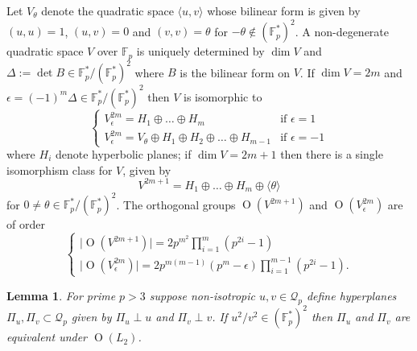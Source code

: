 \documentclass[11pt]{article}
\newtheorem{lem}[thm]{Lemma}
\newcommand{\FF}{\mathbb{F}}
\newcommand{\qc}{\mathcal{Q}}
\newcommand{\la}{\langle}
\newcommand{\ra}{\rangle}
\newcommand{\opn}{\operatorname}
\newcommand{\op}{\oplus}
\newcommand{\beq}{\begin{equation*}}
\newcommand{\eeq}{\end{equation*}}
\begin{document}
Let $V_{\theta}$ denote the quadratic space $\la u, v \ra$ whose bilinear form is given by $(u,u)=1$, $(u, v)=0$ and $(v, v) = \theta$ for $-\theta \notin (\FF_p^*)^2$.
A non-degenerate quadratic space $V$ over $\FF_p$  is uniquely determined by  $\opn{dim} V$ and $\Delta := \opn{det }B \in \FF_p^* / (\FF_p^*)^2$ where $B$ is the bilinear form on $V$.
If $\opn{dim} V=2m$ and $\epsilon= (-1)^m \Delta \in \FF_p^*/(\FF_p^*)^2$ then $V$ is isomorphic to
\beq
\begin{cases}
V_{\epsilon}^{2m}  = H_1 \oplus \ldots \oplus  H_m & \text{if $\epsilon =1$} \\
 V_{\epsilon} ^{2m} = V_{\theta} \oplus H_1 \oplus H_2  \oplus \ldots \oplus H_{m-1} & \text{if $\epsilon = -1$}
\end{cases}
\eeq
where $H_i$ denote hyperbolic planes;
if $\opn{dim} V = 2m+1$ then there is a single isomorphism class for $V$, given by
\beq
V^{2m+1}=H_1 \op \ldots \op H_m \op \la \theta \ra
\eeq
for $0 \neq \theta \in \FF_p^*/(\FF_p^*)^2$.
The orthogonal groups $\opn{O}(V^{2m+1})$ and $\opn{O}(V_{\epsilon}^{2m})$ are of order
\begin{equation}\label{orthgporder}
\begin{cases}
\vert \opn{O}(V^{2m+1})\vert = 2p^{m^2} \prod_{i=1}^m (p^{2i} - 1) \\
\vert \opn{O}(V_{\epsilon}^{2m}) \vert = 2 p^{m(m-1)} (p^m - \epsilon) \prod_{i=1}^{m-1} (p^{2i} - 1).
\end{cases}
\end{equation}
\begin{lem}\label{translemma}
  For prime $p>3$ suppose non-isotropic $u, v  \in \qc_p$  define  hyperplanes $\Pi_u, \Pi_v \subset \qc_p$ given by $\Pi_u \perp u$ and $\Pi_v \perp v$.
  If $u^2/v^2 \in (\FF_p^*)^2$ then $\Pi_u$ and $\Pi_v$ are equivalent under $\opn{O}(L_2)$.
\end{lem}
\end{document}

